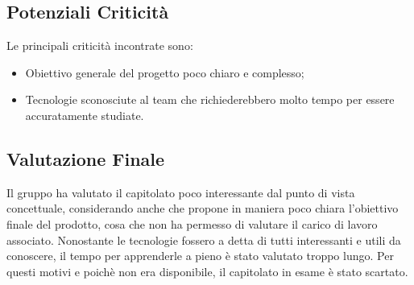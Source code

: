\subsection{Potenziali Criticità}
	Le principali criticità incontrate sono:
	\begin{itemize}
		\item Obiettivo generale del progetto poco chiaro e complesso;
		\item Tecnologie sconosciute al team che richiederebbero molto tempo per essere accuratamente studiate.
	\end{itemize}

\subsection{Valutazione Finale}
	Il gruppo ha valutato il capitolato poco interessante dal punto di vista concettuale, considerando anche che propone in maniera poco chiara l'obiettivo finale del prodotto, cosa che non ha permesso di valutare il carico di lavoro associato. Nonostante le tecnologie fossero a detta di tutti interessanti e utili da conoscere, il tempo per apprenderle a pieno è stato valutato troppo lungo. Per questi motivi e poichè non era disponibile, il capitolato in esame è stato scartato.

